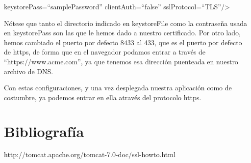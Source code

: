 \documentclass[a4paper]{article}
\begin{document}
\noindent\colorbox{shadecolor}{keystorePass=``samplePassword'' clientAuth=``false'' sslProtocol=``TLS''/\textgreater }

Nótese que tanto el directorio indicado en keystoreFile como la contraseña usada en keystorePass son las que le hemos dado a nuestro certificado. Por otro lado, hemos cambiado el puerto por defecto 8433 al 433, que es el puerto por defecto de https, de forma que en el navegador podamos entrar a través de ``https://www.acme.com'', ya que tenemos esa dirección puenteada en nuestro archivo de DNS.

Con estas configuraciones, y una vez desplegada nuestra aplicación como de costumbre, ya podemos entrar en ella através del protocolo https.

\section{Bibliografía}
http://tomcat.apache.org/tomcat-7.0-doc/ssl-howto.html
\end{document}
